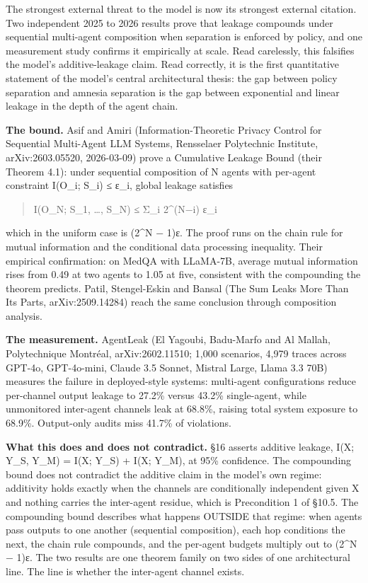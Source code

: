 \documentclass[
  11pt,
]{article}
\begin{document}
The strongest external threat to the model is now its strongest external
citation. Two independent 2025 to 2026 results prove that leakage
compounds under sequential multi-agent composition when separation is
enforced by policy, and one measurement study confirms it empirically at
scale. Read carelessly, this falsifies the model's additive-leakage
claim. Read correctly, it is the first quantitative statement of the
model's central architectural thesis: the gap between policy separation
and amnesia separation is the gap between exponential and linear leakage
in the depth of the agent chain.

\textbf{The bound.} Asif and Amiri (Information-Theoretic Privacy
Control for Sequential Multi-Agent LLM Systems, Rensselaer Polytechnic
Institute, arXiv:2603.05520, 2026-03-09) prove a Cumulative Leakage
Bound (their Theorem 4.1): under sequential composition of N agents with
per-agent constraint I(O\_i; S\_i) ≤ ε\_i, global leakage satisfies

\begin{quote}
I(O\_N; S\_1, \ldots, S\_N) ≤ Σ\_i 2\^{}(N−i) ε\_i
\end{quote}

which in the uniform case is (2\^{}N − 1)ε. The proof runs on the chain
rule for mutual information and the conditional data processing
inequality. Their empirical confirmation: on MedQA with LLaMA-7B,
average mutual information rises from 0.49 at two agents to 1.05 at
five, consistent with the compounding the theorem predicts. Patil,
Stengel-Eskin and Bansal (The Sum Leaks More Than Its Parts,
arXiv:2509.14284) reach the same conclusion through composition
analysis.

\textbf{The measurement.} AgentLeak (El Yagoubi, Badu-Marfo and Al
Mallah, Polytechnique Montréal, arXiv:2602.11510; 1,000 scenarios, 4,979
traces across GPT-4o, GPT-4o-mini, Claude 3.5 Sonnet, Mistral Large,
Llama 3.3 70B) measures the failure in deployed-style systems:
multi-agent configurations reduce per-channel output leakage to 27.2\%
versus 43.2\% single-agent, while unmonitored inter-agent channels leak
at 68.8\%, raising total system exposure to 68.9\%. Output-only audits
miss 41.7\% of violations.

\textbf{What this does and does not contradict.} §16 asserts additive
leakage, I(X; Y\_S, Y\_M) = I(X; Y\_S) + I(X; Y\_M), at 95\% confidence.
The compounding bound does not contradict the additive claim in the
model's own regime: additivity holds exactly when the channels are
conditionally independent given X and nothing carries the inter-agent
residue, which is Precondition 1 of §10.5. The compounding bound
describes what happens OUTSIDE that regime: when agents pass outputs to
one another (sequential composition), each hop conditions the next, the
chain rule compounds, and the per-agent budgets multiply out to (2\^{}N
− 1)ε. The two results are one theorem family on two sides of one
architectural line. The line is whether the inter-agent channel exists.
\end{document}
